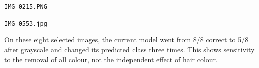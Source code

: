\documentclass[11pt]{article}
\begin{document}
\par\noindent\begin{minipage}{\linewidth}
\texttt{IMG\_0215.PNG}
\end{minipage}\par\medskip
\par\noindent\begin{minipage}{\linewidth}
\texttt{IMG\_0553.jpg}
\end{minipage}\par\medskip
On these eight selected images, the current model went from 8/8 correct to 5/8 after grayscale and changed its predicted class three times. This shows sensitivity to the removal of all colour, not the independent effect of hair colour.
\clearpage
\end{document}

